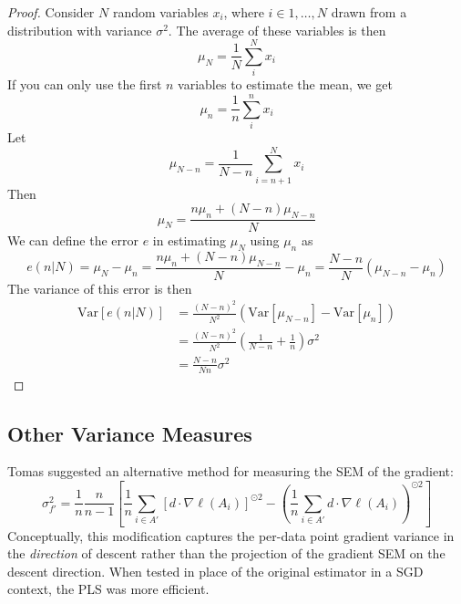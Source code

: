 \documentclass{article}
\begin{document}
\begin{proof}
Consider $N$ random variables $x_i$, where $i\in 1,\ldots,N$ drawn from a distribution with variance $\sigma^2$. The average of these variables is then 
\[ \mu_N = \frac{1}{N}\sum_i^N x_i \]
If you can only use the first $n$ variables to estimate the mean, we get 
\[ \mu_n = \frac{1}{n}\sum_i^n x_i \]
Let 
\[\mu_{N-n} = \frac{1}{N-n}\sum_{i=n+1}^N x_i\]
Then
\[ \mu_N = \frac{n \mu_n + (N-n)\mu_{N-n}}{N} \]
We can define the error $e$ in estimating $\mu_N$ using $\mu_n$ as
\[ e(n|N) = \mu_N-\mu_n = \frac{n\mu_n + (N-n)\mu_{N-n}}{N}-\mu_n = \frac{N-n}{N}(\mu_{N-n}-\mu_n)\]
The variance of this error is then 
\begin{align*}
\text{Var}[e(n|N)] &= \frac{(N-n)^2}{N^2}\left( \text{Var}[\mu_{N-n}] - \text{Var}[\mu_n] \right) \\
&= \frac{(N-n)^2}{N^2} \left(\frac{1}{N-n} +\frac{1}{n} \right) \sigma^2 \\
&= \frac{N-n}{Nn}\sigma^2
\end{align*}
\end{proof}
\subsection{Other Variance Measures}
Tomas suggested an alternative method for measuring the SEM of the gradient: 
\begin{equation}
\label{eq:sdf_tomas} \sigma_{f'}^2 = \frac{1}{n}\frac{n}{n-1} \left[ \frac{1}{n} \sum_{i \in A'} \left[d \cdot \nabla \ell(A_i) \right]^{\odot 2} - \left(\frac{1}{n} \sum_{i \in A'} d\cdot\nabla \ell(A_i) \right)^{\odot 2} \right]
\end{equation}
Conceptually, this modification captures the per-data point gradient variance in the \emph{direction} of descent rather than the projection of the gradient SEM on the descent direction. When tested in place of the original estimator in a SGD context, the PLS was more efficient.
\end{document}
